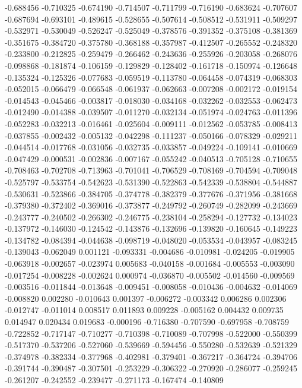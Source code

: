 -0.688456
-0.710325
-0.674190
-0.714507
-0.711799
-0.716190
-0.683624
-0.707607
-0.687694
-0.693101
-0.489615
-0.528655
-0.507614
-0.508512
-0.531911
-0.509297
-0.532971
-0.530049
-0.526247
-0.525049
-0.378576
-0.391352
-0.375108
-0.381369
-0.351675
-0.384720
-0.375780
-0.368188
-0.357987
-0.412507
-0.265552
-0.248320
-0.233800
-0.212825
-0.259479
-0.266462
-0.243636
-0.255926
-0.203058
-0.268076
-0.098868
-0.181874
-0.106159
-0.129829
-0.128402
-0.161718
-0.150974
-0.126648
-0.135324
-0.125326
-0.077683
-0.059519
-0.113780
-0.064458
-0.074319
-0.068303
-0.052015
-0.066479
-0.066548
-0.061937
-0.062663
-0.007208
-0.002172
-0.019154
-0.014543
-0.045466
-0.003817
-0.018030
-0.034168
-0.032262
-0.032553
-0.062473
-0.012490
-0.014388
-0.039507
-0.011270
-0.032134
-0.051974
-0.024763
-0.011396
-0.052283
-0.032213
-0.016461
-0.025604
-0.009111
-0.012562
-0.053785
-0.008413
-0.037855
-0.002432
-0.005132
-0.042298
-0.111237
-0.050166
-0.078329
-0.029211
-0.044514
-0.017768
-0.031056
-0.032735
-0.033857
-0.049224
-0.109141
-0.010669
-0.047429
-0.000531
-0.002836
-0.007167
-0.055242
-0.040513
-0.705128
-0.710655
-0.708463
-0.702708
-0.713963
-0.701041
-0.706529
-0.708169
-0.704594
-0.709048
-0.525797
-0.533754
-0.542623
-0.531390
-0.522863
-0.542339
-0.538804
-0.544887
-0.530631
-0.523866
-0.384705
-0.374778
-0.382379
-0.377676
-0.371956
-0.381668
-0.379380
-0.372402
-0.369016
-0.373877
-0.249792
-0.260749
-0.282099
-0.243669
-0.243777
-0.240502
-0.266302
-0.246775
-0.238104
-0.258294
-0.127732
-0.134023
-0.137972
-0.146030
-0.124542
-0.143876
-0.132696
-0.139820
-0.160645
-0.149223
-0.134782
-0.084394
-0.044638
-0.098719
-0.048020
-0.053534
-0.043957
-0.083245
-0.139043
-0.062049
0.001121
-0.093331
-0.004686
-0.010981
-0.024205
-0.019905
-0.063918
-0.002657
-0.023974
0.005683
-0.040158
-0.001684
-0.005553
-0.003090
-0.017254
-0.008228
-0.002624
0.000974
-0.036870
-0.005502
-0.014560
-0.009569
-0.003516
-0.011844
-0.013648
-0.009451
-0.008058
-0.010436
-0.004632
-0.014069
-0.008820
0.002280
-0.010643
0.001397
-0.006272
-0.003342
0.006286
0.002306
-0.012747
-0.011014
0.008517
0.011893
0.009228
-0.005162
0.004432
0.009735
0.014947
0.020434
0.019683
-0.000196
-0.716380
-0.707590
-0.697958
-0.708759
-0.722852
-0.717147
-0.710277
-0.710398
-0.710089
-0.707998
-0.522000
-0.550399
-0.517370
-0.537206
-0.527060
-0.539669
-0.594456
-0.550280
-0.532639
-0.521329
-0.374978
-0.382334
-0.377968
-0.402981
-0.379401
-0.367217
-0.364724
-0.394706
-0.391744
-0.390487
-0.307501
-0.253229
-0.306322
-0.270920
-0.286077
-0.259245
-0.261207
-0.242552
-0.239477
-0.271173
-0.167474
-0.140809
